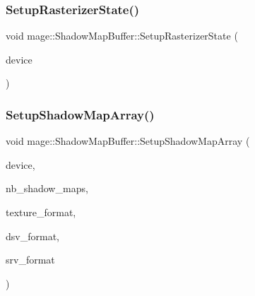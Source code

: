 \hypertarget{structmage_1_1_shadow_map_buffer_a4cc23df062cfc02ab1b0fdbe1f56161e}{}\label{structmage_1_1_shadow_map_buffer_a4cc23df062cfc02ab1b0fdbe1f56161e} 
\subsubsection{\texorpdfstring{Setup\+Rasterizer\+State()}{SetupRasterizerState()}}
{\footnotesize\ttfamily void mage\+::\+Shadow\+Map\+Buffer\+::\+Setup\+Rasterizer\+State (\begin{DoxyParamCaption}\item[{I\+D3\+D11\+Device5 $\ast$}]{device }\end{DoxyParamCaption})\hspace{0.3cm}{\ttfamily [private]}}

\hypertarget{structmage_1_1_shadow_map_buffer_a1da4563b5dc84531f24df51e9e94e154}{}\label{structmage_1_1_shadow_map_buffer_a1da4563b5dc84531f24df51e9e94e154} 
\subsubsection{\texorpdfstring{Setup\+Shadow\+Map\+Array()}{SetupShadowMapArray()}}
{\footnotesize\ttfamily void mage\+::\+Shadow\+Map\+Buffer\+::\+Setup\+Shadow\+Map\+Array (\begin{DoxyParamCaption}\item[{I\+D3\+D11\+Device5 $\ast$}]{device,  }\item[{size\+\_\+t}]{nb\+\_\+shadow\+\_\+maps,  }\item[{D\+X\+G\+I\+\_\+\+F\+O\+R\+M\+AT}]{texture\+\_\+format,  }\item[{D\+X\+G\+I\+\_\+\+F\+O\+R\+M\+AT}]{dsv\+\_\+format,  }\item[{D\+X\+G\+I\+\_\+\+F\+O\+R\+M\+AT}]{srv\+\_\+format }\end{DoxyParamCaption})\hspace{0.3cm}{\ttfamily [private]}}

\hypertarget{structmage_1_1_shadow_map_buffer_af1aa6aeab0c71dfd52b97fa7167cac17}{}\label{structmage_1_1_shadow_map_buffer_af1aa6aeab0c71dfd52b97fa7167cac17} 
